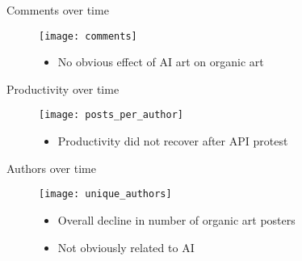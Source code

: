 \documentclass[aspectratio=169]{beamer}
\def\defaultscalefig{0.4}
\begin{document}
\begin{frame}{Comments over time}
	\begin{figure}
		\begin{minipage}{0.45\textwidth}
			\centering
			\texttt{[image: comments]}
		\end{minipage}\hfill
		\begin{minipage}{0.45\textwidth}
			\centering
			\begin{itemize}
				\item No obvious effect of AI art on organic art
			\end{itemize}
		\end{minipage}
	\end{figure}
\end{frame}

\begin{frame}{Productivity over time}
	\begin{figure}
		\begin{minipage}{0.45\textwidth}
			\centering
			\texttt{[image: posts\_per\_author]}
		\end{minipage}\hfill
		\begin{minipage}{0.45\textwidth}
			\centering
			\begin{itemize}
				\item Productivity did not recover after API protest
			\end{itemize}
		\end{minipage}
	\end{figure}
\end{frame}

\begin{frame}{Authors over time}
	\begin{figure}
		\begin{minipage}{0.45\textwidth}
			\centering
			\texttt{[image: unique\_authors]}
		\end{minipage}\hfill
		\begin{minipage}{0.45\textwidth}
			\centering
			\begin{itemize}
				\item Overall decline in number of organic art posters
				\item Not obviously related to AI
			\end{itemize}
		\end{minipage}
	\end{figure}

\end{frame}
\end{document}
